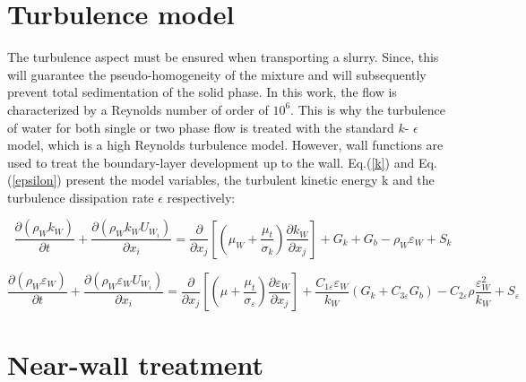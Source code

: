 \documentclass[11pt]{report}
\begin{document}
 \section{Turbulence model }
%
The turbulence aspect must be ensured when transporting a slurry. 
%
Since, this will guarantee the pseudo-homogeneity of the mixture and will subsequently prevent total sedimentation of the solid phase. 
%
In this work, the flow is characterized by a Reynolds number of order of $10^6$. This is why the turbulence of water for both single or two phase flow is treated with the standard $k$- $\epsilon$ model, which is a high Reynolds turbulence model. 
%
However, wall functions are used to treat the boundary-layer development up to the wall. Eq.(\ref{k}) and Eq.(\ref{epsilon}) present the model variables, the turbulent kinetic energy k and the turbulence dissipation rate $\epsilon$ respectively:

 \begin{equation}
 \frac{\partial(\rho_W k_W)}{\partial t}+\frac{\partial\left(\rho_W k_W U_{W_i}\right)}{\partial x_{i}}=\frac{\partial}{\partial x_{j}}\left[\left(\mu_W+\frac{\mu_{t}}{\sigma_{k}}\right) \frac{\partial k_W}{\partial x_{j}}\right]+G_{k}+G_{b}-\rho_W \varepsilon_W+S_{k}
 \label{k}
 \end{equation}

 \begin{equation}
 \frac{\partial(\rho_W \varepsilon_W)}{\partial t}+\frac{\partial\left(\rho_W \varepsilon_W U_{W_i}\right)}{\partial x_{i}}=\frac{\partial}{\partial x_{j}}\left[\left(\mu+\frac{\mu_{t}}{\sigma_{\varepsilon}}\right) \frac{\partial \varepsilon_W}{\partial x_{j}}\right]+\frac{C_{1 \varepsilon} \varepsilon_W}{k_W}\left(G_{k}+C_{3 \varepsilon} G_{b}\right)-C_{2 \varepsilon} \rho \frac{\varepsilon_{W}^{2}}{k_W}+S_{\varepsilon}
 \label{epsilon}
 \end{equation}

 \section{Near-wall treatment} \label{NWT}
\end{document}
